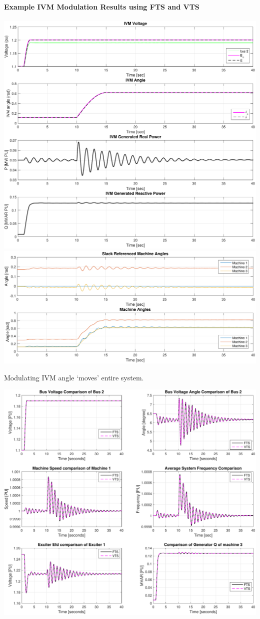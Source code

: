 \documentclass[12pt]{article}
\begin{document}
\onehalfspacing
\paragraph{Example IVM Modulation Results using FTS and VTS}
\begin{center}
\includegraphics[width=.9\linewidth]{IVM-simoutput}\\
\includegraphics[width=.9\linewidth]{IVM-angleComp}
\end{center}
Modulating IVM angle `moves' entire system.

\pagebreak


\includegraphics[width=\linewidth]{IVM-VTScomp}\\
\end{document}
